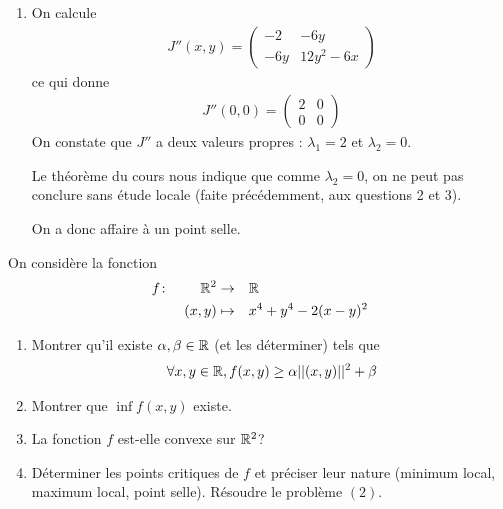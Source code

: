 \documentclass[french,a4paper,10pt]{article}
\begin{document}
\begin{td-sol}
\begin{enumerate}
			\item On calcule
			\[\begin{aligned}
				J''(x,y)=\begin{pmatrix}
					-2&-6y\\-6y&12y^2-6x
				\end{pmatrix}
			\end{aligned}\]
			ce qui donne
			\[\begin{aligned}
				J''(0,0)=\begin{pmatrix}
					2&0\\0&0
				\end{pmatrix}
			\end{aligned}\]
			On constate que $J''$ a deux valeurs propres : $\lambda_1=2$ et $\lambda_2=0$.
			
			Le théorème du cours nous indique que comme $\lambda_2=0$, on ne peut pas conclure sans étude locale (faite précédemment, aux questions 2 et 3).
			
			On a donc affaire à un point selle.
		\end{enumerate}
		
	\end{td-sol}
	\medspace
	
	\begin{td-exo}[3]
		On considère la fonction
		\[\begin{aligned}
			f&\colon&\mathbb{R}^2&\to&&\mathbb{R}\\
			&&(x,y)&\mapsto&& x^4+y^4-2(x-y)^2
		\end{aligned}\]
		
		\begin{enumerate}
			\item Montrer qu'il existe $\alpha, \beta\in\mathbb{R}$ (et les déterminer) tels que
				\[\begin{aligned}
					\forall x,y\in \mathbb{R}, f(x,y)\ge \alpha||(x,y)||^2+\beta
				\end{aligned}\]
				
			\item Montrer que $\inf f(x,y)$ existe.
				
			\item La fonction $f$ est-elle convexe sur $\mathbb{R}^2$?
			
			\item Déterminer les points critiques de $f$ et préciser leur nature (minimum local, maximum local, point selle). Résoudre le problème $(2)$.
		\end{enumerate}
	\end{td-exo}
	\medspace
	
\end{document}
